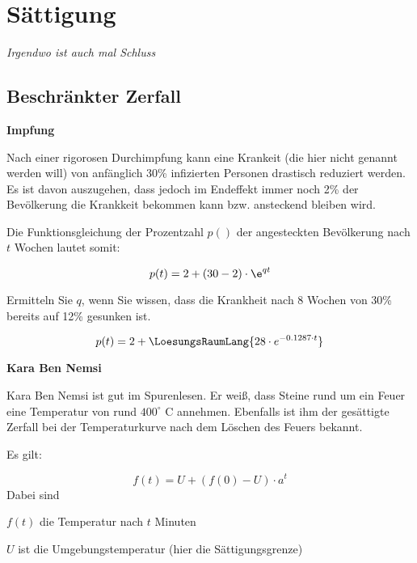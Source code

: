 \newpage
\section{Sättigung}
\textit{Irgendwo ist auch mal Schluss}

\subsection{Beschränkter Zerfall}





\bbwActAufgabenNr{} \textbf{Impfung}

Nach einer rigorosen Durchimpfung kann eine Krankeit (die hier nicht genannt werden will) von anfänglich 30\% infizierten Personen drastisch reduziert werden. Es ist davon auszugehen, dass jedoch im Endeffekt immer noch 2\% der Bevölkerung die Krankkeit bekommen kann bzw. ansteckend bleiben wird.

Die Funktionsgleichung der Prozentzahl $p()$ der angesteckten Bevölkerung nach $t$ Wochen lautet somit:

$$p(t) = 2 + (30-2)\cdot \e^{qt}$$

Ermitteln Sie $q$, wenn Sie wissen, dass die Krankheit nach 8 Wochen von 30\% bereits auf 12\% gesunken ist.

$$p(t) = 2 + \LoesungsRaumLang{28\cdot{}e^{-0.1287\cdot{}t}}$$


\platzFuerBerechnungenBisEndeSeite{}




\bbwActAufgabenNr{} \textbf{Kara Ben Nemsi}

Kara Ben Nemsi ist gut im Spurenlesen. Er weiß, dass Steine rund um ein Feuer eine Temperatur von rund $400^\circ$ C annehmen.
Ebenfalls ist ihm der gesättigte Zerfall bei der Temperaturkurve nach dem Löschen des Feuers bekannt.

Es gilt:

$$f(t) = U + \left(f(0) - U\right) \cdot{} a^t$$
Dabei sind

$f(t)$ die Temperatur nach $t$ Minuten

$U$ ist die Umgebungstemperatur (hier die Sättigungsgrenze)

